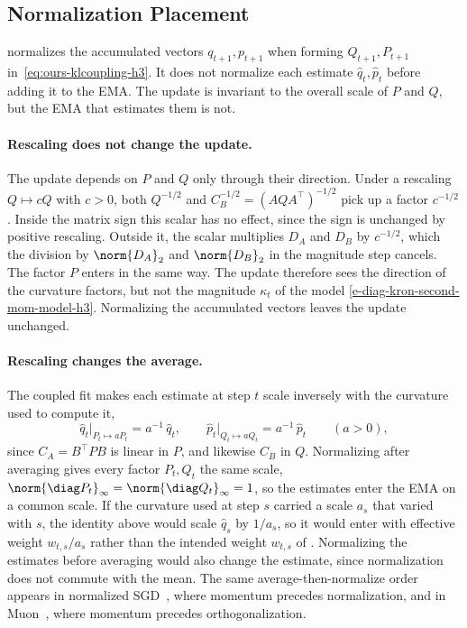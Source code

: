 \subsection{Normalization Placement}
\label{sec:scale-placement-h3}

\methodname{} normalizes the accumulated vectors $q_{t+1},p_{t+1}$ when
forming $Q_{t+1},P_{t+1}$ in~\eqref{eq:ours-klcoupling-h3}. It does not
normalize each estimate $\hat{q}_t,\hat{p}_t$ before adding it to
the EMA. The update is invariant to the overall scale of $P$ and $Q$, but
the EMA that estimates them is not.

\paragraph{Rescaling does not change the update.}
The update depends on $P$ and $Q$ only through their direction. Under a
rescaling $Q\mapsto cQ$ with $c>0$, both $Q^{-1/2}$ and
$C_B^{-1/2}=(AQA^\top)^{-1/2}$ pick up a factor $c^{-1/2}$. Inside the
matrix sign this scalar has no effect, since the sign is unchanged by
positive rescaling. Outside it, the scalar multiplies $D_A$ and $D_B$ by
$c^{-1/2}$, which the division by $\norm{D_A}_2$ and
$\norm{D_B}_2$ in the magnitude step cancels. The factor $P$ enters in
the same way. The update therefore sees the direction of the curvature
factors, but not the magnitude $\kappa_t$ of the model
\eqref{e-diag-kron-second-mom-model-h3}. Normalizing the accumulated
vectors leaves the update unchanged.

\paragraph{Rescaling changes the average.}
The coupled fit makes each estimate at step $t$ scale inversely with the
curvature used to compute it,
\[
  \hat{q}_t\big|_{P_t\mapsto aP_t}=a^{-1}\,\hat{q}_t,
  \qquad
  \hat{p}_t\big|_{Q_t\mapsto aQ_t}=a^{-1}\,\hat{p}_t
  \qquad(a>0),
\]
since $C_A=B^\top PB$ is linear in $P$, and likewise $C_B$ in $Q$.
Normalizing after averaging gives every factor $P_t,Q_t$ the same scale,
$\norm{\diag P_t}_\infty=\norm{\diag Q_t}_\infty=1$, so the estimates
enter the EMA on a common scale. If the curvature used at step
$s$ carried a scale $a_s$ that varied with $s$, the identity above would scale
$\hat{q}_s$ by $1/a_s$, so it would enter with effective weight
$w_{t,s}/a_s$ rather than the intended weight $w_{t,s}$ of
. Normalizing the estimates before
averaging would also change the estimate, since normalization does not
commute with the mean. The same average-then-normalize order appears in
normalized SGD~\cite{cutkosky_nigt}, where momentum precedes
normalization, and in Muon~\cite{denoise_ortho}, where momentum precedes
orthogonalization.
